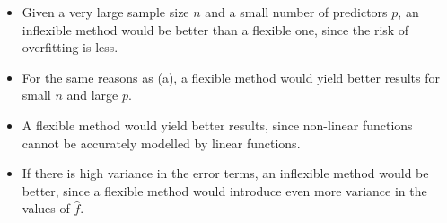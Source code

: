 \begin{itemize}
    \item[(a)] Given a very large sample size $n$ and a small number of predictors
        $p$, an inflexible method would be better than a flexible one,
        since the risk of
        overfitting is less.
    \item[(b)] For the same reasons as (a), a flexible method would yield better
        results for small $n$ and large $p$.
    \item[(c)] A flexible method would yield better results, since non-linear
        functions cannot be accurately modelled by linear functions.
    \item[(d)] If there is high variance in the error terms, an inflexible method
        would be better, since a flexible method would introduce even more variance
        in the values of $\hat{f}$.
\end{itemize}
